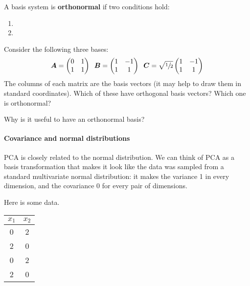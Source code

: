 \documentclass[11pt]{article}
\begin{document}
\qu A basis system is \textbf{orthonormal} if two conditions hold:
\begin{enumerate}
	\item {}
	\item {}
\end{enumerate}
Consider the following three bases: 
\[
	{\bm A}     = \begin{pmatrix}0 & 1\\1 & 1\end{pmatrix} \;\;
	{\bm B}     = \begin{pmatrix}1 & -1\\1 & 1\end{pmatrix} \;\;
	\bm{C} = \sqrt{\sfrac{1}{2}}\begin{pmatrix}1 & -1\\1 & 1\end{pmatrix}
\]
The columns of each matrix are the basis vectors (it may help to draw them in standard coordinates). Which of these have orthogonal basis vectors? Which one is orthonormal?

\qu Why is it useful to have an orthonormal basis?

\paragraph{Covariance and normal distributions}

PCA is closely related to the normal distribution. We can think of PCA as a basis transformation that makes it look like the data was sampled from a standard multivariate normal distribution: it makes the variance 1 in every dimension, and the covariance 0 for every pair of dimensions.

\qu Here is some data.

\begin{tabular}{c c}
$x_1$ & $x_2$ \\
\hline
0 & 2 \\
2 & 0 \\
0 & 2 \\
2 & 0 \\
\hline
\end{tabular}
\end{document}
